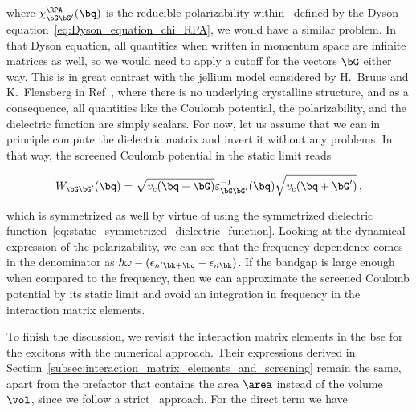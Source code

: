 \noindent where $\chi^{\RPA}_{\bG \bG'} (\bq)$ is the reducible polarizability within \rpa~defined by the Dyson equation~\eqref{eq:Dyson_equation_chi_RPA}, we would have a similar problem.
In that Dyson equation, all quantities when written in momentum space are infinite matrices as well, so we would need to apply a cutoff for the vectors $\bG$ either way.
This is in great contrast with the jellium model considered by H.~Bruus and K.~Flensberg in Ref~\cite{Bruus_Flensberg_2004}, where there is no underlying crystalline structure, and as a consequence, all quantities like the Coulomb potential, the polarizability, and the dielectric function are simply scalars.
For now, let us assume that we can in principle compute the dielectric matrix and invert it without any problems.
In that way, the screened Coulomb potential in the static limit reads

\begin{equation}
    \label{eq:screened_static_Coulomb_potential}
    W_{\bG \bG'} (\bq) = \sqrt{v_c(\bq + \bG)}  \varepsilon^{-1}_{\bG \bG'} (\bq) \sqrt{v_c(\bq + \bG')} \,,
\end{equation}

\noindent which is symmetrized as well by virtue of using the symmetrized dielectric function~\eqref{eq:static_symmetrized_dielectric_function}.
Looking at the dynamical expression of the polarizability, we can see that the frequency dependence comes in the denominator as $\hbar \omega - (\epsilon_{n' \bk+\bq} - \epsilon_{n \bk})$.
If the bandgap is large enough when compared to the frequency, then we can approximate the screened Coulomb potential by its static limit and avoid an integration in frequency in the interaction matrix elements.

To finish the discussion, we revisit the interaction matrix elements in the \gls{bse} for the excitons with the numerical approach.
Their expressions derived in Section~\ref{subsec:interaction_matrix_elements_and_screening} remain the same, apart from the prefactor that contains the area $\area$ instead of the volume $\vol$, since we follow a strict \bd\ approach.
For the direct term we have


